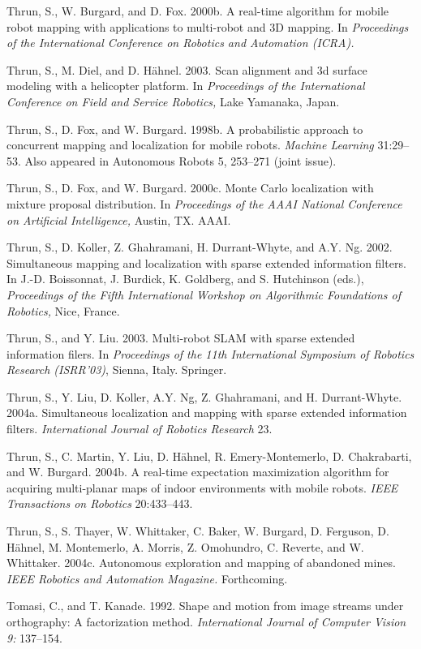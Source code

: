 \documentclass[10pt,a4paper]{article}
\begin{document}
Thrun, S., W. Burgard, and D. Fox. 2000b. A real-time algorithm for mobile robot
mapping with applications to multi-robot and 3D mapping. In \textit{Proceedings of the
International Conference on Robotics and Automation (ICRA).}

Thrun, S., M. Diel, and D. Hähnel. 2003. Scan alignment and 3d surface modeling
with a helicopter platform. In \textit{Proceedings of the International Conference on Field and
Service Robotics,} Lake Yamanaka, Japan.

Thrun, S., D. Fox, and W. Burgard. 1998b. A probabilistic approach to concurrent
mapping and localization for mobile robots. \textit{Machine Learning} 31:29–53. Also appeared
in Autonomous Robots 5, 253–271 (joint issue).

Thrun, S., D. Fox, and W. Burgard. 2000c. Monte Carlo localization with mixture
proposal distribution. In \textit{Proceedings of the AAAI National Conference on Artificial
Intelligence,} Austin, TX. AAAI.

Thrun, S., D. Koller, Z. Ghahramani, H. Durrant-Whyte, and A.Y. Ng. 2002. Simultaneous
mapping and localization with sparse extended information filters. In J.-D.
Boissonnat, J. Burdick, K. Goldberg, and S. Hutchinson (eds.),\textit{ Proceedings of the
Fifth International Workshop on Algorithmic Foundations of Robotics,} Nice, France.

Thrun, S., and Y. Liu. 2003. Multi-robot SLAM with sparse extended information filers.
In \textit{Proceedings of the 11th International Symposium of Robotics Research (ISRR’03)},
Sienna, Italy. Springer.

Thrun, S., Y. Liu, D. Koller, A.Y. Ng, Z. Ghahramani, and H. Durrant-Whyte. 2004a.
Simultaneous localization and mapping with sparse extended information filters.
\textit{International Journal of Robotics Research} 23.

Thrun, S., C. Martin, Y. Liu, D. Hähnel, R. Emery-Montemerlo, D. Chakrabarti, and
W. Burgard. 2004b. A real-time expectation maximization algorithm for acquiring
multi-planar maps of indoor environments with mobile robots. \textit{IEEE Transactions
on Robotics} 20:433–443.

Thrun, S., S. Thayer, W. Whittaker, C. Baker, W. Burgard, D. Ferguson, D. Hähnel,
M. Montemerlo, A. Morris, Z. Omohundro, C. Reverte, and W. Whittaker. 2004c.
Autonomous exploration and mapping of abandoned mines. \textit{IEEE Robotics and
Automation Magazine.} Forthcoming.

Tomasi, C., and T. Kanade. 1992. Shape and motion from image streams under
orthography: A factorization method. \textit{International Journal of Computer Vision 9:}
137–154.
\end{document}
